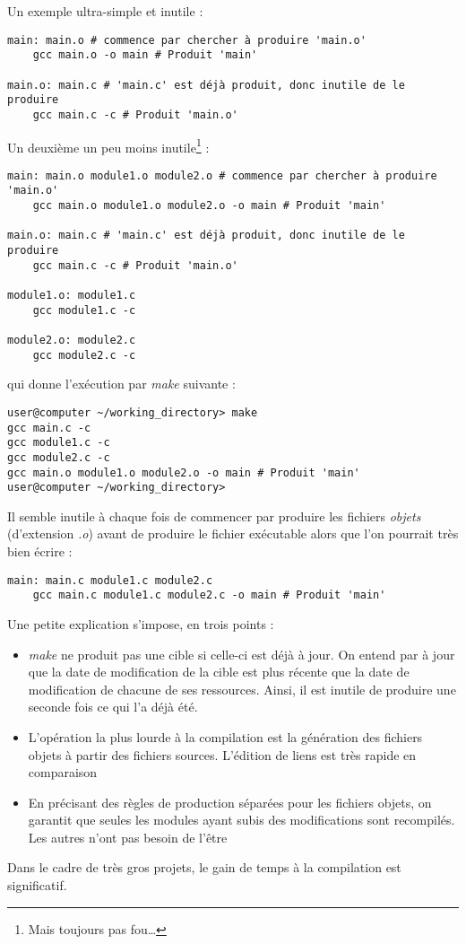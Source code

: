 \documentclass[../../../main.tex]{subfiles}
\begin{document}
Un exemple ultra-simple et inutile :
\begin{verbatim}
main: main.o # commence par chercher à produire 'main.o'
	gcc main.o -o main # Produit 'main'

main.o: main.c # 'main.c' est déjà produit, donc inutile de le produire
	gcc main.c -c # Produit 'main.o'
\end{verbatim}
Un deuxième un peu moins inutile\footnote{Mais toujours pas fou\dots} :
\begin{verbatim}
main: main.o module1.o module2.o # commence par chercher à produire 'main.o'
	gcc main.o module1.o module2.o -o main # Produit 'main'

main.o: main.c # 'main.c' est déjà produit, donc inutile de le produire
	gcc main.c -c # Produit 'main.o'

module1.o: module1.c
	gcc module1.c -c

module2.o: module2.c
	gcc module2.c -c
\end{verbatim}
qui donne l'exécution par \textit{make} suivante :
\begin{verbatim}
user@computer ~/working_directory> make
gcc main.c -c
gcc module1.c -c
gcc module2.c -c
gcc main.o module1.o module2.o -o main # Produit 'main'
user@computer ~/working_directory>
\end{verbatim}
Il semble inutile à chaque fois de commencer par produire les fichiers \textit{objets} (d'extension \textit{.o}) avant de produire le fichier exécutable alors que l'on pourrait très bien écrire :
\begin{verbatim}
main: main.c module1.c module2.c
	gcc main.c module1.c module2.c -o main # Produit 'main'
\end{verbatim}
Une petite explication s'impose, en trois points :
\begin{itemize}
	\item \textit{make} ne produit pas une cible si celle-ci est déjà à jour. On entend par à jour que la date de modification de la cible est plus récente que la date de modification de chacune de ses ressources. Ainsi, il est inutile de produire une seconde fois ce qui l'a déjà été.
	\item L'opération la plus lourde à la compilation est la génération des fichiers objets à partir des fichiers sources. L'édition de liens est très rapide en comparaison
	\item En précisant des règles de production séparées pour les fichiers objets, on garantit que seules les modules ayant subis des modifications sont recompilés. Les autres n'ont pas besoin de l'être
\end{itemize}
Dans le cadre de très gros projets, le gain de temps à la compilation est significatif.
\end{document}
